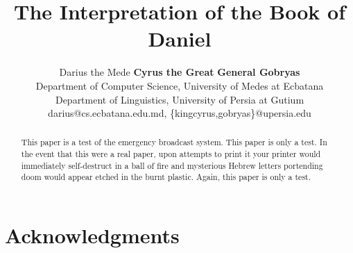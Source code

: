 \documentclass[11pt]{article}
\author{Darius the Mede\affilA \qquad
{\bf Cyrus the Great\affilB}  \qquad
{\bf General Gobryas \affilB} \qquad\\
\affilA Department of Computer Science, University of Medes at Ecbatana \\
\affilB Department of Linguistics, University of Persia at Gutium  \\
darius@cs.ecbatana.edu.md, \{kingcyrus,gobryas\}@upersia.edu}
\date{}
\begin{document}
\title{The Interpretation of the Book of Daniel}
\maketitle
\begin{abstract}
This paper is a test of the emergency broadcast system. This paper is
only a test. In the event that this were a real paper, upon attempts to
print it your printer would immediately self-destruct in a ball of fire and
mysterious Hebrew letters portending doom would appear etched in the burnt
plastic. Again, this paper is only a test.
\end{abstract}



%
%
%
%
%

\section{Acknowledgments}





\end{document}
